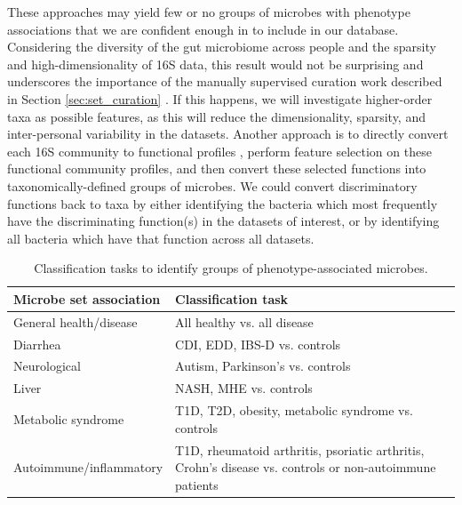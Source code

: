 \documentclass[12pt]{article}
\begin{document}
These approaches may yield few or no groups of microbes with phenotype associations
that we are confident enough in to include in our database.
Considering the diversity of the gut microbiome across people and the
sparsity and high-dimensionality of 16S data, 
this result would not be surprising and underscores the importance of the
manually supervised curation work described in Section \ref{sec:set_curation} \cite{knights-biomarkers-2011, wang-pval_method-2016}.
If this happens, we will investigate higher-order taxa as possible features,
as this will reduce the dimensionality, sparsity, and inter-personal 
variability in the datasets.
Another approach is to directly convert each 16S community to functional profiles \cite{langille-picrust-2013}, perform feature selection on these functional community profiles, and then
convert these selected functions into taxonomically-defined groups of microbes. 
We could convert discriminatory functions back to taxa
by either identifying the bacteria which most frequently have
the discriminating function(s) in the datasets of interest, or by identifying all bacteria which have that function across all datasets.
{
\renewcommand{\arraystretch}{1.2}
\begin{table}
\begin{center}
\begin{tabular}{ m{6cm} m{10cm} }
	\hline
	\textbf{Microbe set association} & \textbf{Classification task} \\
	\hline
	General health/disease & All healthy vs. all disease \\
	Diarrhea & CDI, EDD, IBS-D vs. controls \\
	Neurological & Autism, Parkinson's vs. controls \\
	Liver & NASH, MHE vs. controls\\
	Metabolic syndrome & T1D, T2D, obesity, metabolic syndrome vs. 
	controls \\
	Autoimmune/inflammatory & T1D, rheumatoid arthritis, psoriatic arthritis, Crohn's disease 
	vs. controls or non-autoimmune patients \\
	\hline
\end{tabular}
\caption{Classification tasks to identify groups of phenotype-associated microbes.}\label{tab:classifications}
\end{center}
\end{table}
}
\end{document}
